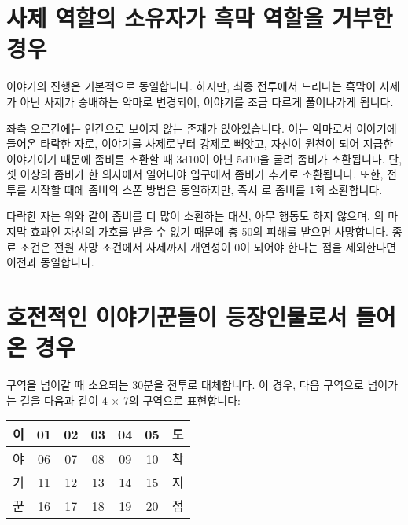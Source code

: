 \documentclass{report}
\begin{document}
	\hypertarget{alternative:no-criminal}{}
	\section{사제 역할의 소유자가 흑막 역할을 거부한 경우}
		이야기의 진행은 기본적으로 동일합니다. 하지만, 최종 전투에서 드러나는 흑막이 사제가 아닌 사제가 숭배하는 악마로 변경되어, 이야기를 조금 다르게 풀어나가게 됩니다.
		
		좌측 오르간에는 인간으로 보이지 않는 존재가 앉아있습니다. 이는 악마로서 이야기에 들어온 타락한 자로,  이야기를 사제로부터 강제로 빼앗고, 자신이 원천이 되어 지급한 이야기이기 때문에 좀비를 소환할 때 3d10이 아닌 5d10을 굴려 좀비가 소환됩니다. 단, 셋 이상의 좀비가 한 의자에서 일어나야 입구에서 좀비가 추가로 소환됩니다. 또한, 전투를 시작할 때에 좀비의 스폰 방법은 동일하지만, 즉시 로 좀비를 1회 소환합니다.
		
		타락한 자는 위와 같이 좀비를 더 많이 소환하는 대신, 아무 행동도 하지 않으며, 의 마지막 효과인 자신의 가호를 받을 수 없기 때문에 총 50의 피해를 받으면 사망합니다. 종료 조건은 전원 사망 조건에서 사제까지 개연성이 0이 되어야 한다는 점을 제외한다면 이전과 동일합니다.
	
	\hypertarget{alternative:war-ready}{}
	\section{호전적인 이야기꾼들이 등장인물로서 들어온 경우}
		구역을 넘어갈 때 소요되는 30분을 전투로 대체합니다. 이 경우, 다음 구역으로 넘어가는 길을 다음과 같이 4 $\times$ 7의 구역으로 표현합니다:
		
		\begin{center}
			\begin{tabular}{!{\color{black}\vrule}c!{\color{black}\vrule}c!{\color{black}\vrule}c!{\color{black}\vrule}c!{\color{black}\vrule}c!{\color{black}\vrule}c!{\color{black}\vrule}c!{\color{black}\vrule}}
				\hline
				이 & 01 & 02 & 03 & 04 & 05 & 도 \\\hline
				야 & 06 & 07 & 08 & 09 & 10 & 착 \\\hline
				기 & 11 & 12 & 13 & 14 & 15 & 지 \\\hline
				꾼 & 16 & 17 & 18 & 19 & 20 & 점 \\\hline
			\end{tabular}
		\end{center}
		
\end{document}
